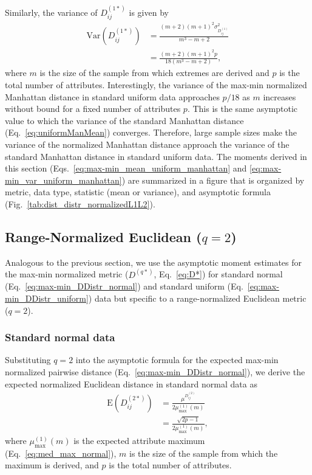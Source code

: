 \documentclass[10pt,letterpaper]{article}
\begin{document}
Similarly, the variance of $D^{(1*)}_{ij}$ is given by
%
\begin{equation}\label{eq:max-min_var_uniform_manhattan}
\begin{aligned}
\text{Var}\left(D^{(1*)}_{ij}\right) &= \frac{(m+2)(m+1)^2\sigma^2_{D^{(1)}_{ij}}}{m^3-m+2} \\
&= \frac{(m+2)(m+1)^2p}{18(m^3 - m + 2)},
\end{aligned}
\end{equation}
%
where $m$ is the size of the sample from which extremes are derived and $p$ is the total number of attributes. Interestingly, the variance of the max-min normalized Manhattan distance in standard uniform data approaches $p/18$ as $m$ increases without bound for a fixed number of attributes $p$. This is the same asymptotic value to which the variance of the standard Manhattan distance (Eq.~\ref{eq:uniformManMean}) converges. Therefore, large sample sizes make the variance of the normalized Manhattan distance approach the variance of the standard Manhattan distance in standard uniform data. The moments derived in this section (Eqs.~\ref{eq:max-min_mean_uniform_manhattan} and \ref{eq:max-min_var_uniform_manhattan}) are summarized in a figure that is organized by metric, data type, statistic (mean or variance), and asymptotic formula (Fig.~\ref{tab:dist_distr_normalizedL1L2}).

\subsection*{Range-Normalized Euclidean \texorpdfstring{($q=2$)}{}}

Analogous to the previous section, we use the asymptotic moment estimates for the max-min normalized metric ($D^{(q*)}$, Eq.~\ref{eq:D*}) for standard normal (Eq.~\ref{eq:max-min_DDistr_normal}) and standard uniform (Eq.~\ref{eq:max-min_DDistr_uniform}) data but specific to a range-normalized Euclidean metric ($q=2$).

\subsubsection*{Standard normal data}

Substituting $q=2$ into the asymptotic formula for the expected max-min normalized pairwise distance (Eq.~\ref{eq:max-min_DDistr_normal}), we derive the expected normalized Euclidean distance in standard normal data as
%
\begin{equation}\label{eq:max-min_mean_normal_euclidean}
\begin{aligned}
\text{E}\left(D^{(2*)}_{ij}\right) &= \frac{\mu^{D^{(2)}_{ij}}}{2\mu^{(1)}_\text{max}(m)} \\
&= \frac{\sqrt{2p - 1}}{2\mu^{(1)}_\text{max}(m)},
\end{aligned}
\end{equation}
%
where $\mu^{(1)}_\text{max}(m)$ is the expected attribute maximum (Eq.~\ref{eq:med_max_normal}), $m$ is the size of the sample from which the maximum is derived, and $p$ is the total number of attributes.
\end{document}
